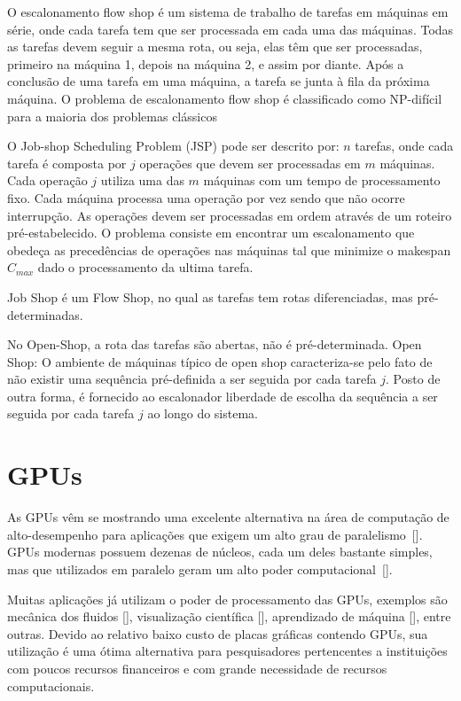 O escalonamento flow shop é um sistema de trabalho de tarefas em máquinas em série, onde cada tarefa tem que ser processada em cada uma das máquinas. Todas as tarefas devem seguir a mesma rota, ou seja, elas têm que ser processadas, primeiro na máquina 1, depois na máquina 2, e assim por diante. Após a conclusão de uma tarefa em uma máquina, a tarefa se junta à fila da próxima máquina. O problema de escalonamento flow shop é classificado como NP-difícil para a maioria dos problemas clássicos

O Job-shop Scheduling Problem (JSP) pode ser descrito por: $n$ tarefas, onde cada tarefa é composta por $j$ operações que devem ser processadas em $m$ máquinas. Cada operação $j$ utiliza uma das $m$ máquinas com um tempo de processamento fixo. Cada máquina processa uma operação por vez sendo que não ocorre interrupção. As operações devem ser processadas em ordem através de um roteiro pré-estabelecido. O problema consiste em encontrar um escalonamento que obedeça as precedências de operações nas máquinas tal que minimize o makespan $C_{max}$ dado o processamento da ultima tarefa. 

Job Shop é um Flow Shop, no qual as tarefas tem rotas diferenciadas, mas pré-determinadas.

No Open-Shop, a rota das tarefas são abertas, não é pré-determinada. Open Shop: O ambiente de máquinas típico de open shop caracteriza-se pelo fato de não existir uma sequência pré-definida a ser seguida por cada tarefa $j$. Posto de outra forma, é fornecido ao escalonador liberdade de escolha da sequência a ser seguida por cada tarefa $j$ ao longo do sistema.


\section{GPUs}\label{intro:historico}

As GPUs vêm se mostrando uma excelente alternativa na área de computação de alto-desempenho para aplicações que exigem um alto grau de paralelismo~[\cite{gpu}]. GPUs modernas possuem dezenas de núcleos, cada um deles bastante simples, mas que utilizados em paralelo geram um alto poder computacional~[\cite{cuda}].

Muitas aplicações já utilizam o poder de processamento das GPUs, exemplos são mecânica dos fluidos [\cite{fluido}], visualização científica [\cite{visualizacao}],  aprendizado de máquina [\cite{Aprendizado}], entre outras. Devido ao relativo baixo custo de placas gráficas contendo GPUs, sua utilização é uma ótima alternativa para pesquisadores pertencentes a instituições com poucos recursos financeiros e com grande necessidade de recursos computacionais.


